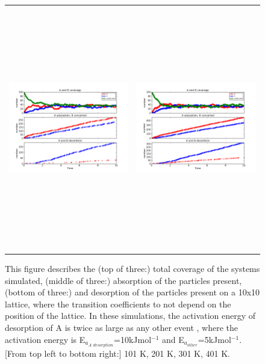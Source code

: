 \documentclass[11pt]{article}
\begin{document}
\begin{figure}[h!]
\begin{tabular}{cc}
\includegraphics[width=3.5in, height=4.2in]{./coadsorb_irreversible/AtoBirreversible10x10_301_Ades2x_EAx10E3_EB5E3_3.png} &
\includegraphics[width=3.5in, height=4.2in]{./coadsorb_irreversible/AtoBirreversible10x10_401_Ades2x_EAx10E3_EB5E3_3.png} 
\end{tabular}
\caption{This figure describes the (top of three:) total coverage of the systems simulated, (middle of three:) absorption of the particles present, (bottom of three:) and desorption of the particles present on a 10x10 lattice, where the transition coefficients to not depend on the position of the lattice. In these simulations, the activation energy of desorption of A is twice as large as any other event , where the activation energy is E$_{a_{A:desorption}}$=10kJmol$^{-1}$ and E$_{a_{other}}$=5kJmol$^{-1}$. [From top left to bottom right:] 101 K, 201 K, 301 K, 401 K. }
\end{figure}
\end{document}
